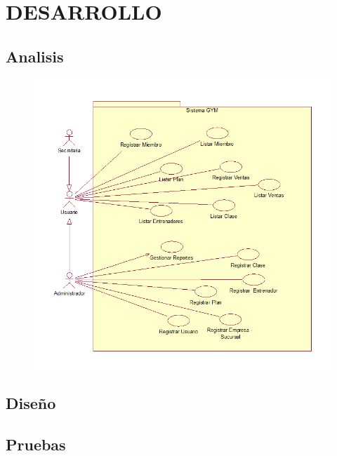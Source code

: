 \section{DESARROLLO} 
\subsection{Analisis}
	\begin{figure}[htb]
		\begin{center}
			\includegraphics[width=15cm]{./Imagenes/CasosDeUso}
		\end{center}
	\end{figure}
	
\subsection{Diseño}
\subsection{Pruebas}







